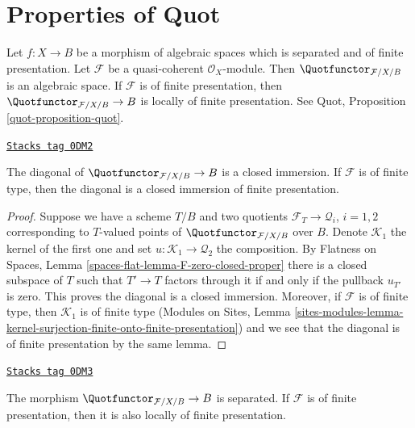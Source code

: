 \section{Properties of Quot}
\label{moduli-section-quot}
Let $f : X \to B$ be a morphism of algebraic spaces which is
separated and of finite presentation. Let $\mathcal{F}$ be a
quasi-coherent $\mathcal{O}_X$-module. Then
$\Quotfunctor_{\mathcal{F}/X/B}$ is an algebraic space.
If $\mathcal{F}$ is of finite presentation, then
$\Quotfunctor_{\mathcal{F}/X/B} \to B$ is locally of finite
presentation. See Quot, Proposition \ref{quot-proposition-quot}.

\begin{lemma}
\label{moduli-lemma-quot-diagonal-closed}
\href{https://stacks.math.columbia.edu/tag/0DM2}{\texttt{Stacks tag 0DM2}}

The diagonal of $\Quotfunctor_{\mathcal{F}/X/B} \to B$ is a closed immersion.
If $\mathcal{F}$ is of finite type, then the diagonal is a closed
immersion of finite presentation.
\end{lemma}

\begin{proof}
Suppose we have a scheme $T/B$ and two quotients
$\mathcal{F}_T \to \mathcal{Q}_i$, $i = 1, 2$ corresponding
to $T$-valued points of $\Quotfunctor_{\mathcal{F}/X/B}$ over $B$.
Denote $\mathcal{K}_1$ the kernel of the first one and set
$u : \mathcal{K}_1 \to \mathcal{Q}_2$ the composition.
By Flatness on Spaces, Lemma \ref{spaces-flat-lemma-F-zero-closed-proper}
there is a closed subspace of $T$ such that $T' \to T$
factors through it if and only if the pullback $u_{T'}$ is zero.
This proves the diagonal is a closed immersion.
Moreover, if $\mathcal{F}$ is of finite type, then
$\mathcal{K}_1$ is of finite type
(Modules on Sites, Lemma
\ref{sites-modules-lemma-kernel-surjection-finite-onto-finite-presentation})
and we see that the diagonal is of finite presentation by
the same lemma.
\end{proof}

\begin{lemma}
\label{moduli-lemma-quot-s-lfp}
\href{https://stacks.math.columbia.edu/tag/0DM3}{\texttt{Stacks tag 0DM3}}

The morphism $\Quotfunctor_{\mathcal{F}/X/B} \to B$ is separated.
If $\mathcal{F}$ is of finite presentation, then it is also
locally of finite presentation.
\end{lemma}

